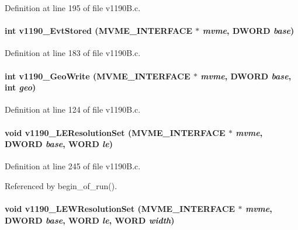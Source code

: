 Definition at line 195 of file v1190B.c.
\paragraph[{v1190\_\-EvtStored}]{\setlength{\rightskip}{0pt plus 5cm}int v1190\_\-EvtStored ({\bf MVME\_\-INTERFACE} $\ast$ {\em mvme}, \/  {\bf DWORD} {\em base})}\hfill\label{v1190B_8c_a2636506cdfe67ff87a209e926069222c}


Definition at line 183 of file v1190B.c.
\paragraph[{v1190\_\-GeoWrite}]{\setlength{\rightskip}{0pt plus 5cm}int v1190\_\-GeoWrite ({\bf MVME\_\-INTERFACE} $\ast$ {\em mvme}, \/  {\bf DWORD} {\em base}, \/  int {\em geo})}\hfill\label{v1190B_8c_a0ef526a3b6aa5b2bfa7b71712fcbd538}


Definition at line 124 of file v1190B.c.
\paragraph[{v1190\_\-LEResolutionSet}]{\setlength{\rightskip}{0pt plus 5cm}void v1190\_\-LEResolutionSet ({\bf MVME\_\-INTERFACE} $\ast$ {\em mvme}, \/  {\bf DWORD} {\em base}, \/  {\bf WORD} {\em le})}\hfill\label{v1190B_8c_a1d56cae6f08c550adf87b649c548e5aa}


Definition at line 245 of file v1190B.c.

Referenced by begin\_\-of\_\-run().
\paragraph[{v1190\_\-LEWResolutionSet}]{\setlength{\rightskip}{0pt plus 5cm}void v1190\_\-LEWResolutionSet ({\bf MVME\_\-INTERFACE} $\ast$ {\em mvme}, \/  {\bf DWORD} {\em base}, \/  {\bf WORD} {\em le}, \/  {\bf WORD} {\em width})}\hfill\label{v1190B_8c_ac02d820365ff4ea1705e56198d6a04fb}


